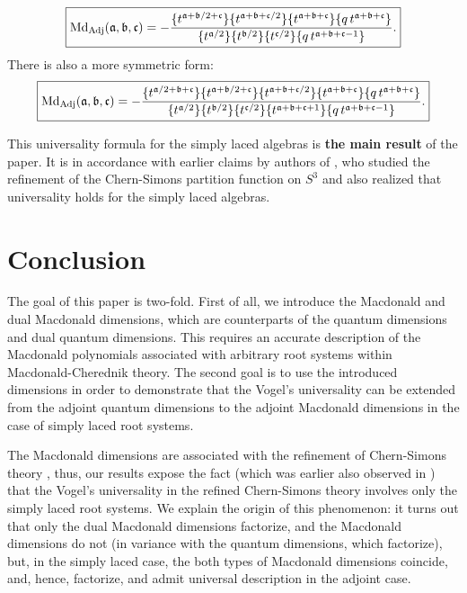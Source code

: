 \documentclass{article}
\def\MD{\hbox{Md}}%
\def\MD{\hbox{Md}}%
\begin{document}
\begin{equation}\label{main1}
\boxed{
    \MD_{\text{Adj}}(\mathfrak{a},\mathfrak{b},\mathfrak{c}) =    - {\{t^{\mathfrak{a}+\mathfrak{b}/2+\mathfrak{c}}\}\{t^{\mathfrak{a}+\mathfrak{b}+\mathfrak{c}/2}\}
    \{t^{\mathfrak{a}+\mathfrak{b}+\mathfrak{c}}\}\{q\,t^{\mathfrak{a}+\mathfrak{b}+\mathfrak{c}}\}\over
    \{t^{\mathfrak{a}/2}\}\{t^{\mathfrak{b}/2}\}
    \{t^{\mathfrak{c}/2}\}\{q\,t^{\mathfrak{a}+\mathfrak{b}+\mathfrak{c}-1}\}}.
    }
\end{equation}
There is also a more symmetric form:
\begin{equation}\label{main2}
    \boxed{\MD_{\text{Adj}}(\mathfrak{a},\mathfrak{b},\mathfrak{c}) =  - \frac{\{t^{\mathfrak{a}/2+\mathfrak{b}+\mathfrak{c}}\}\{t^{\mathfrak{a}+\mathfrak{b}/2+\mathfrak{c}}\}\{t^{\mathfrak{a}+\mathfrak{b}+\mathfrak{c}/2}\}
    \{t^{\mathfrak{a}+\mathfrak{b}+\mathfrak{c}}\}\{q\,t^{\mathfrak{a}+\mathfrak{b}+\mathfrak{c}}\}}{\{t^{\mathfrak{a}/2}\}
    \{t^{\mathfrak{b}/2}\}\{t^{\mathfrak{c}/2}\} \{t^{\mathfrak{a}+\mathfrak{b}+\mathfrak{c}+1}\} \{q\,t^{\mathfrak{a}+\mathfrak{b}+\mathfrak{c}-1}\}}.}
\end{equation}

This universality formula for the simply laced algebras is \textbf{the main result} of the paper.
It is in accordance with earlier claims by authors of \cite{KS,AM1,Mane}, who studied the refinement of the Chern-Simons partition function on $S^3$ and also realized that universality holds for the simply laced algebras.



\section{Conclusion}

The goal of this paper is two-fold. First of all, we introduce the Macdonald and dual Macdonald dimensions, which are counterparts of the quantum dimensions and dual quantum dimensions. This requires an accurate description of the Macdonald polynomials associated with arbitrary root systems within Macdonald-Cherednik theory. The second goal is to use the introduced dimensions in order to demonstrate that the Vogel's universality can be extended from the adjoint quantum dimensions to the adjoint Macdonald dimensions in the case of simply laced root systems.

The Macdonald dimensions are associated with the refinement of Chern-Simons theory \cite{AgSh1,AgSh2}, thus, our results expose the fact (which was earlier also observed in \cite{KS, AM1, Mane}) that the Vogel's universality in the refined Chern-Simons theory involves only the simply laced root systems. We explain the origin of this phenomenon: it turns out that only the dual Macdonald dimensions factorize, and the Macdonald dimensions do not (in variance with the quantum dimensions, which factorize), but, in the simply laced case, the both types of Macdonald dimensions coincide, and, hence, factorize, and admit universal description in the adjoint case.
\end{document}
